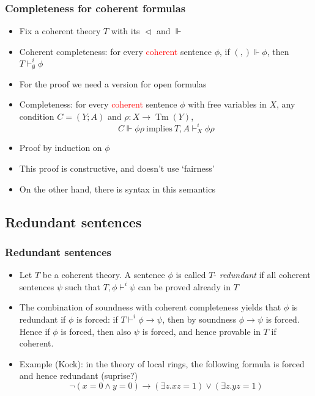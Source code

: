 \documentclass[handout,11pt]{beamer}
\newcommand{\red}[1]{\textcolor{red}{#1}}
\newcommand{\es}{\emptyset}
\newcommand{\covd}{\mathrel{\vartriangleleft}}
\DeclareMathOperator{\Tm}{Tm}
\begin{document}
\begin{frame}
\frametitle{Completeness for coherent formulas}
 \begin{itemize}[<+->]
  \item Fix a coherent theory $T$ with its $\covd$ and $\Vdash$
  \item Coherent completeness: for every \red{coherent} sentence
  $\phi$, if $(,)\Vdash\phi$, then $T\vdash_{\es}^i \phi$
  \item For the proof we need a version 
  for open formulas 
  \item Completeness: for every \red{coherent} sentence
  $\phi$ with free variables in $X$, any condition $C=(Y;A)$
  and $\rho: X\to\Tm(Y)$,
  $$C\Vdash \phi\rho~\text{implies}~T,A\vdash_X^i \phi\rho$$
  \item Proof by induction on $\phi$
  \item This proof is constructive, and doesn't use `fairness'
  \item On the other hand, there is syntax in this semantics
 \end{itemize}
\end{frame}

\subsection{Redundant sentences}

\begin{frame}
\frametitle{Redundant sentences}
 \begin{itemize}[<+->]
  \item Let $T$ be a coherent theory. A sentence $\phi$ is called
  $T$- \emph{redundant} if all coherent sentences $\psi$ such that 
  $T,\phi \vdash^i \psi$ can be proved already in $T$
  \item The combination of soundness with coherent completeness
  yields that $\phi$ is redundant if $\phi$ is forced:
  if $T\vdash^i \phi\to\psi$, then by soundness $\phi\to\psi$ is forced.
  Hence if $\phi$ is forced, then also $\psi$ is forced, 
  and hence provable in $T$ if coherent.
  \item Example (Kock): in the theory of local rings, the following
  formula is forced and hence redundant (suprise?)
  $$\neg(x=0\land y=0) \to (\exists z.xz=1) \lor (\exists z.yz=1)$$
 \end{itemize}
\end{frame}

\end{document}
